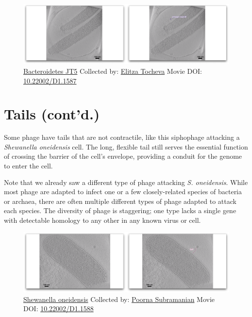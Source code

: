 \documentclass[]{tufte-book}
\begin{document}
\begin{figure}
\includegraphics{movie_stills/10_2} \caption[\protect\hyperlink{tree}{Bacteroidetes JT5} Collected by:
\protect\hyperlink{elitza_tocheva}{Elitza Tocheva} Movie DOI:
\href{https://doi.org/10.22002/D1.1587}{10.22002/D1.1587}]{\protect\hyperlink{tree}{Bacteroidetes JT5} Collected by:
\protect\hyperlink{elitza_tocheva}{Elitza Tocheva} Movie DOI:
\href{https://doi.org/10.22002/D1.1587}{10.22002/D1.1587}}\label{fig:10-2}
\end{figure}

\section{Tails (cont'd.)}\label{tails-contd.}

Some phage have tails that are not contractile, like this siphophage
attacking a \emph{Shewanella oneidensis} cell. The long, flexible tail
still serves the essential function of crossing the barrier of the
cell's envelope, providing a conduit for the genome to enter the cell.

Note that we already saw a different type of phage attacking \emph{S.
oneidensis}. While most phage are adapted to infect one or a few
closely-related species of bacteria or archaea, there are often multiple
different types of phage adapted to attack each species. The diversity
of phage is staggering; one type lacks a single gene with detectable
homology to any other in any known virus or cell.





\begin{figure}
\includegraphics{movie_stills/10_3} \caption[\protect\hyperlink{tree}{Shewanella oneidensis} Collected by:
\protect\hyperlink{poorna_subramanian}{Poorna Subramanian} Movie DOI:
\href{https://doi.org/10.22002/D1.1588}{10.22002/D1.1588}]{\protect\hyperlink{tree}{Shewanella oneidensis} Collected by:
\protect\hyperlink{poorna_subramanian}{Poorna Subramanian} Movie DOI:
\href{https://doi.org/10.22002/D1.1588}{10.22002/D1.1588}}\label{fig:10-3}
\end{figure}
\end{document}
